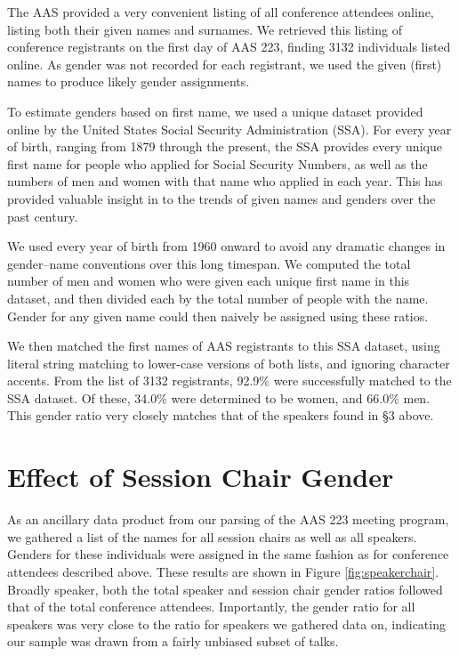 \documentclass[iop]{emulateapj}
\begin{document}
The AAS provided a very convenient listing of all conference attendees online, listing both their given names and surnames. We retrieved this listing of conference registrants on the first day of AAS 223, finding 3132 individuals listed online. As gender was not recorded for each registrant, we used the given (first) names to produce likely gender assignments.

To estimate genders based on first name, we used a unique dataset provided online by the United States Social Security Administration (SSA). For every year of birth, ranging from 1879 through the present, the SSA provides every unique first name for people who applied for Social Security Numbers, as well as the numbers of men and women with that name who applied in each year. This has provided valuable insight in to the trends of given names and genders over the past century.


We used every year of birth from 1960 onward to avoid any dramatic changes in gender--name conventions over this long timespan. We computed the total number of men and women who were given each unique first name in this dataset, and then divided each by the total number of people with the name. Gender for any given name could then naively be assigned using these ratios. 

We then matched the first names of AAS registrants to this SSA dataset, using literal string matching to lower-case versions of both lists, and ignoring character accents. From the list of 3132 registrants, 92.9\% were successfully matched to the SSA dataset. Of these,  34.0\% were determined to be women, and 66.0\% men. This gender ratio very closely matches that of the speakers found in \S3 above.



\section{Effect of Session Chair Gender}

As an ancillary data product from our parsing of the AAS 223 meeting program, we gathered a list of the names for all session chairs as well as all speakers. Genders for these individuals were assigned in the same fashion as for conference attendees described above. These results are shown in Figure \ref{fig:speakerchair}. Broadly speaker, both the total speaker and session chair gender ratios followed that of the total conference attendees. Importantly, the gender ratio for all speakers was very close to the ratio for speakers we gathered data on, indicating our sample was drawn from a fairly unbiased subset of talks.
\end{document}
